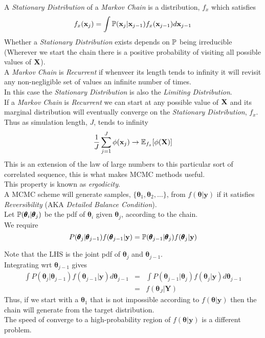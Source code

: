 \documentclass[11pt,a4paper]{article}
\begin{document}
A \textit{Stationary Distribution} of a \textit{Markov Chain} is a distribution, $f_x$ which satisfies
$$f_x(\textbf{x}_j)=\int \mathbb{P}(\textbf{x}_j|\textbf{x}_{j-1})f_x(\textbf{x}_{j-1})d\textbf{x}_{j-1}$$
\nb Whether a \textit{Stationary Distribution} exists depends on $\mathbb{P}$ being irreducible (\ie Wherever we start the chain there is a positive probability of visiting all possible values of $\textbf{X}$).\\

A \textit{Markov Chain} is \textit{Recurrent} if whenveer its length tends to infinity it will revisit any non-negligible set of values an infinite number of times.\\
\nb In this case the \textit{Stationary Distribution} is also the \textit{Limiting Distribution}.\\

If a \textit{Markov Chain} is \textit{Recurrent} we can start at any possible value of $\textbf{X}$ and its marginal distribution will eventually converge on the \textit{Stationary Distribution}, $f_x$.\\
Thus as simulation length, $J$, tends to infinity
$$\frac1J\sum_{j=1}^J\phi(\textbf{x}_j)\to\mathbb{E}_{f_x}[\phi(\textbf{X})]$$
This is an extension of the law of large numbers to this particular sort of correlated sequence, this is what makes MCMC methods useful.\\
\nb This property is known as \textit{ergodicity}.\\

A MCMC scheme will generate samples, $\{\pmb\theta_1,\pmb\theta_2,\dots\}$, from $f(\pmb\theta|\textbf{y})$ if it satisfies \textit{Reversibility} (AKA \textit{Detailed Balance Condition}).\\
Let $\mathbb{P}(\pmb\theta_i|\pmb\theta_j)$ be the pdf of $\pmb\theta_i$ given $\pmb\theta_j$, according to the chain.\\
We require
$$P(\pmb\theta_j|\pmb\theta_{j-1})f(\pmb\theta_{j-1}|\textbf{y})=\mathbb{P}(\pmb\theta_{j-1}|\pmb\theta_j)f(\pmb\theta_j|\textbf{y})$$

Note that the LHS is the joint pdf of $\pmb\theta_j$ and $\pmb\theta_{j-1}$.\\
Integrating wrt $\pmb\theta_{j-1}$ gives
\[\begin{array}{rcl}
\displaystyle\int P(\pmb\theta_j|\pmb\theta_{j-1})f(\pmb\theta_{j-1}|\textbf{y})d\pmb\theta_{j-1}&=&\displaystyle\int P(\pmb\theta_{j-1}|\pmb\theta_j)f(\pmb\theta_j|\textbf{y})d\pmb\theta_{j-1}\\
&=&f(\pmb\theta_J|\textbf{Y})
\end{array}\]
Thus, if we start with a $\pmb\theta_1$ that is not impossible according to $f(\pmb\theta|\textbf{y})$ then the chain will generate from the target distribution.\\
The speed of converge to a high-probability region of $f(\pmb\theta|\textbf{y})$ is a different problem.\\
\end{document}

